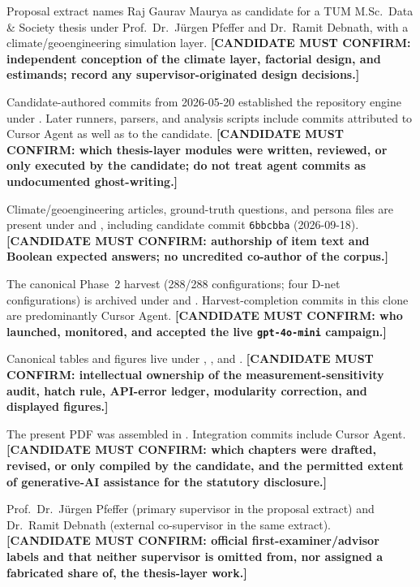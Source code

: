 \documentclass[
  11pt,a4paper,twoside,openright,
  bibliography=totoc,listof=totoc,
  captions=tableheading,headings=normal,numbers=noenddot
]{scrbook}
\begin{document}
\begin{description}[style=nextline,leftmargin=1.2em]
  \item[Conception]
    Proposal extract names Raj Gaurav Maurya as candidate for a TUM
    M.Sc.\ Data \& Society thesis under Prof.\ Dr.\ J\"urgen Pfeffer and
    Dr.\ Ramit Debnath, with a climate/geoengineering simulation layer.
    \textbf{[CANDIDATE MUST CONFIRM: independent conception of the climate
    layer, factorial design, and estimands; record any supervisor-originated
    design decisions.]}
  \item[Software]
    Candidate-authored commits from 2026-05-20 established the repository
    engine under .
    Later  runners, parsers, and analysis scripts
    include commits attributed to Cursor Agent as well as to the candidate.
    \textbf{[CANDIDATE MUST CONFIRM: which thesis-layer modules were written,
    reviewed, or only executed by the candidate; do not treat agent commits
    as undocumented ghost-writing.]}
  \item[Stimuli]
    Climate/geoengineering articles, ground-truth questions, and persona
    files are present under  and
    , including candidate commit
    \texttt{6bbcbba} (2026-09-18).
    \textbf{[CANDIDATE MUST CONFIRM: authorship of item text and Boolean
    expected answers; no uncredited co-author of the corpus.]}
  \item[Campaign execution]
    The canonical Phase~2 harvest (288/288 configurations; four D-net
    configurations) is archived under 
    and .
    Harvest-completion commits in this clone are predominantly Cursor Agent.
    \textbf{[CANDIDATE MUST CONFIRM: who launched, monitored, and accepted
    the live \texttt{gpt-4o-mini} campaign.]}
  \item[Analysis and figures]
    Canonical tables and figures live under
    ,
    , and
    .
    \textbf{[CANDIDATE MUST CONFIRM: intellectual ownership of the
    measurement-sensitivity audit, hatch rule, API-error ledger, modularity
    correction, and displayed figures.]}
  \item[Writing]
    The present PDF was assembled in .
    Integration commits include Cursor Agent.
    \textbf{[CANDIDATE MUST CONFIRM: which chapters were drafted, revised,
    or only compiled by the candidate, and the permitted extent of
    generative-AI assistance for the statutory disclosure.]}
  \item[Supervision]
    Prof.\ Dr.\ J\"urgen Pfeffer (primary supervisor in the proposal extract)
    and Dr.\ Ramit Debnath (external co-supervisor in the same extract).
    \textbf{[CANDIDATE MUST CONFIRM: official first-examiner/advisor labels
    and that neither supervisor is omitted from, nor assigned a fabricated
    share of, the thesis-layer work.]}
\end{description}
\end{document}
